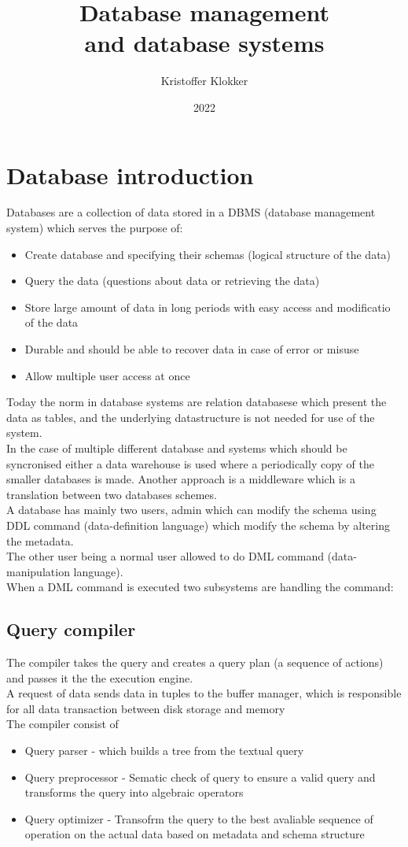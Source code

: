 \documentclass[12pt, a4paper]{article}
\title{Database management \\and database systems}
\date{2022}
\author{Kristoffer Klokker}
\begin{document}
	\maketitle
	\clearpage
	\tableofcontents
	\clearpage
	\section{Database introduction}
		Databases are a collection of data stored in a DBMS (database management system) which serves the purpose of:
			\begin{itemize}
				\item Create database and specifying their schemas (logical structure of the data)
				\item Query the data (questions about data or retrieving the data)
				\item Store large amount of data in long periods with easy access and modificatio of the data
				\item Durable and should be able to recover data in case of error or misuse
				\item Allow multiple user access at once
			\end{itemize}
			Today the norm in database systems are relation databasese which present the data as tables, and the underlying datastructure is not needed for use of the system.\\
			In the case of multiple different database and systems which should be syncronised either a data warehouse is used where a periodically copy of the smaller databases is made. Another approach is a middleware which is a translation between two databases schemes.\\
			A database has mainly two users, admin which can modify the schema using DDL command (data-definition language) which modify the schema by altering the metadata.\\
			The other user being a normal user allowed to do DML command (data-manipulation language). \\
			When a DML command is executed two subsystems are handling the command:
				\subsection{Query compiler}
					The compiler takes the query and creates a query plan (a sequence of actions) and passes it the the execution engine.\\
					A request of data sends data in tuples to the buffer manager, which is responsible for all data transaction between disk storage and memory\\
					The compiler consist of
					\begin{itemize}
						\item Query parser - which builds a tree from the textual query
						\item Query preprocessor - Sematic check of query to ensure a valid query and transforms the query into algebraic operators
						\item Query optimizer - Transofrm the query to the best avaliable sequence of operation on the actual data based on metadata and schema structure
					\end{itemize}
\end{document}
